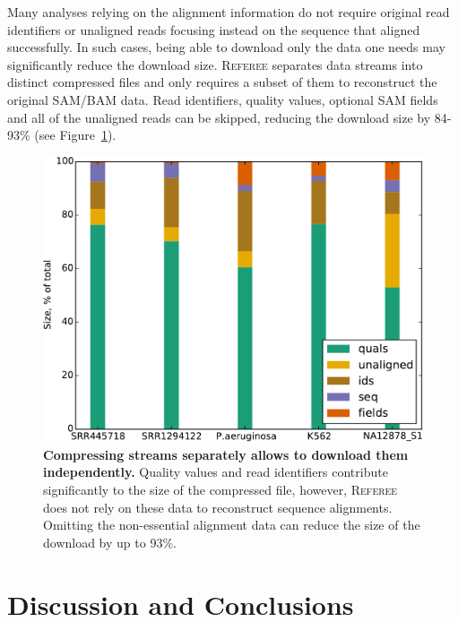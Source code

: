 \documentclass[12pt]{cmuthesis}
\newcommand{\refer}{\textsc{Referee}\xspace}
\begin{document}
Many analyses relying on the alignment information do not require original read identifiers or unaligned reads focusing instead on the sequence that aligned successfully. In such cases, being able to download only the data one needs may significantly reduce the download size. \refer separates data streams into distinct compressed files and only requires a subset of them to reconstruct the original SAM/BAM data. Read identifiers, quality values, optional SAM fields and all of the unaligned reads can be skipped, reducing the download size by 84-93\% (see Figure~\ref{fig:fields}).


\begin{figure}[ht!]
  \centering
  \includegraphics[width=0.6\linewidth]{figures/Referee-size-breakdown-May4}
  \caption{\textbf{Compressing streams separately allows to download them independently.} Quality values and read identifiers contribute significantly to the size of the compressed file, however, \refer does not rely on these data to reconstruct sequence alignments. Omitting the non-essential alignment data can reduce the size of the download by up to 93\%.}
  \label{fig:fields}
\end{figure}




\chapter{Discussion and Conclusions}
\end{document}
